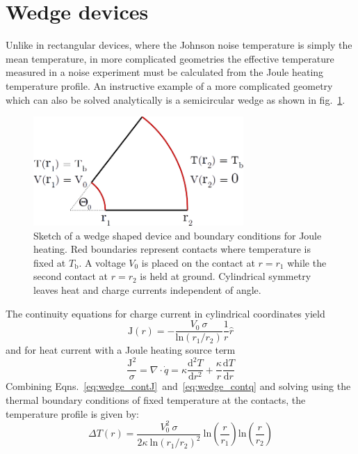 \section{Wedge devices}
Unlike in rectangular devices, where the Johnson noise temperature is simply the mean temperature, in more complicated geometries the effective temperature measured in a noise experiment must be calculated from the Joule heating temperature profile. An instructive example of a more complicated geometry which can also be solved analytically is a semicircular wedge as shown in fig.~\ref{fig:KCwedge}.
\begin{figure}
\centering
\includegraphics[width=80mm]{figures/thermal_via_noise/wedge.png}
\caption{Sketch of a wedge shaped device and boundary conditions for Joule heating. Red boundaries represent contacts where temperature is fixed at $T_\mathrm{b}$. A voltage $V_0$ is placed on the contact at $r=r_1$ while the second contact at $r=r_2$ is held at ground. Cylindrical symmetry leaves heat and charge currents independent of angle.}
\label{fig:KCwedge}
\end{figure}
The continuity equations for charge current in cylindrical coordinates yield
\begin{equation}\label{eq:wedge_contJ}
\mathrm{J}(r) = -\frac{V_0~\sigma}{\mathrm{ln}(r_1/r_2)}\frac{1}{r}\hat{r}
\end{equation}
and for heat current with a Joule heating source term
\begin{equation}\label{eq:wedge_contq}
\frac{\mathrm{J}^2}{\sigma} = \nabla\cdot\dot{q} = \kappa\frac{\mathrm{d}^2 T}{\mathrm{d}r^2}+\frac{\kappa}{r}\frac{\mathrm{d} T}{\mathrm{d}r}
\end{equation}
Combining Eqns.~\ref{eq:wedge_contJ}~and~\ref{eq:wedge_contq} and solving using the thermal boundary conditions of fixed temperature at the contacts, the temperature profile is given by:
\begin{equation}\label{eq:wedge_Tprofile}
\Delta T(r) = \frac{V_0^2~\sigma}{2\kappa~\mathrm{ln}\left(r_1/r_2\right)^2}~\mathrm{ln}\left(\frac{r}{r_1}\right)\mathrm{ln}\left(\frac{r}{r_2}\right)
\end{equation}
